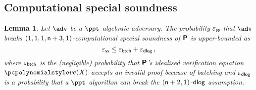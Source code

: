 \let\accentvec\vec \documentclass[runningheads,10pt]{llncs}
\newtheorem{lemma}[theorem]{Lemma}
\begin{document}
\subsection{Computational special soundness}
\begin{lemma}
	\label{lem:plonkprot_ss}
	Let $\adv$ be a $\ppt$ algebraic adversary. The probability $\varepsilon_{\mathsf{ss}}$ that $\adv$ breaks 
	 $(1, 1, 1, \mathsf{n} + 3, 1)$-computational special soundness of $\bm{\mathsf{P}}$ is upper-bounded as
	 \[
	 	\varepsilon_{\mathsf{ss}} \leq \varepsilon_{\mathsf{btch}} + \varepsilon_{\mathsf{dlog}}\,,
	 \] 
	 where $\varepsilon_{\mathsf{btch}}$ is the (negligible) probability that $\bm{\mathsf{P}}$'s
   idealised verification equation $\vereq(X)$ accepts an invalid proof because
   of batching and $\varepsilon_{\mathsf{dlog}}$ is a probability that a $\ppt$ algorithm can break
   the $(\mathsf{n} + 2, 1)$-$\mathsf{dlog}$ assumption.
\end{lemma}
\end{document}
